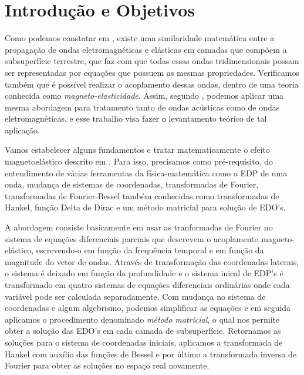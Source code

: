 \chapter{Introdu\c{c}\~ao e Objetivos}

Como podemos constatar em \cite{eringen_1963}, existe uma similaridade matem\'atica entre a propaga\c{c}\~ao de ondas eletromagn\'eticas e el\'asticas em camadas que comp\~oem a subsuperf\'icie terrestre, que faz com que todas essas ondas tridimensionais possam ser representadas por equa\c{c}\~oes que possuem as mesmas propriedades. Verificamos tamb\'em que \'e poss\'ivel realizar o acoplamento dessas ondas, dentro de uma teoria conhecida como \textit{magneto-elasticidade}. Assim, segundo \cite{Ursin-1983}, podemos aplicar uma mesma abordagem para tratamento tanto de ondas ac\'usticas como de ondas eletromagn\'eticas, e esse trabalho visa fazer o levantamento te\'orico de tal aplica\c{c}\~ao. 

Vamos estabelecer alguns fundamentos e tratar matematicamente o efeito magnetoel\'astico descrito em \cite{pinho_2018}. Para isso, precisamos como pr\'e-requisito, do entendimento de v\'arias ferramentas da f\'isica-matem\'atica como a EDP de uma onda, mudan\c{c}a de sistemas de coordenadas, transformadas de Fourier, transformadas de Fourier-Bessel tamb\'em conhecidas como transformadas de Hankel, fun\c{c}\~ao Delta de Dirac e um m\'etodo matricial para solu\c{c}\~ao de EDO's.

A abordagem consiste basicamente em usar as tranformadas de Fourier no sistema de equa\c{c}\~oes diferenciais parciais que descrevem o acoplamento magneto-el\'astico, escrevendo-o em fun\c{c}\~ao da frequ\^encia temporal e em fun\c{c}\~ao da magnitude do vetor de ondas. Atrav\'es de transforma\c{c}\~ao das coordenadas laterais, o sistema \'e deixado em fun\c{c}\~ao da profundidade e o sistema inical de EDP's \'e transformado em quatro sistemas de equa\c{c}\~oes diferenciais ordin\'arias onde cada variável pode ser calculada separadamente. Com mudan\c{c}a no sistema de coordenadas e algum algebrismo, podemos simplificar as equa\c{c}\~oes e em seguida aplicamos o procedimento denominado \textit{m\'etodo matricial}, o qual nos permite obter a solu\c{c}\~ao das EDO's em cada camada de subsuperf\'icie. Retornamos as solu\c{c}\~oes para o sistema de coordenadas iniciais, aplicamos a transformada de Hankel com aux\'ilio das fun\c{c}\~oes de Bessel e por \'ultimo a transformada inversa de Fourier para obter as solu\c{c}\~oes no espa\c{c}o real novamente.

